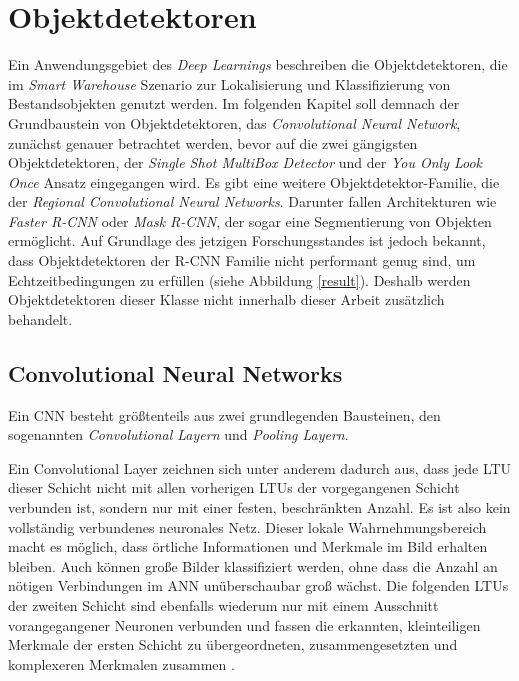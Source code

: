 \section{Objektdetektoren}

Ein Anwendungsgebiet des \textit{Deep Learnings} beschreiben die Objektdetektoren, die im \textit{Smart Warehouse} Szenario zur Lokalisierung und Klassifizierung von Bestandsobjekten genutzt werden. Im folgenden Kapitel soll demnach der Grundbaustein von Objektdetektoren, das \textit{Convolutional Neural Network}, zunächst genauer betrachtet werden, bevor auf die zwei gängigsten Objektdetektoren, der \textit{Single Shot MultiBox Detector} und der \textit{You Only Look Once} Ansatz eingegangen wird. Es gibt eine weitere Objektdetektor-Familie, die der \textit{Regional Convolutional Neural Networks}. Darunter fallen Architekturen wie \textit{Faster R-CNN} oder \textit{Mask R-CNN}, der sogar eine Segmentierung von Objekten ermöglicht. Auf Grundlage des jetzigen Forschungsstandes ist jedoch bekannt, dass Objektdetektoren der R-CNN Familie nicht performant genug sind, um Echtzeitbedingungen zu erfüllen (siehe Abbildung \ref{result}). Deshalb werden Objektdetektoren dieser Klasse nicht innerhalb dieser Arbeit zusätzlich behandelt.

\subsection*{Convolutional Neural Networks}

Ein CNN besteht größtenteils aus zwei grundlegenden Bausteinen, den sogenannten \textit{Convolutional Layern} und \textit{Pooling Layern}.

Ein Convolutional Layer zeichnen sich unter anderem dadurch aus, dass jede LTU dieser Schicht nicht mit allen vorherigen LTUs der vorgegangenen Schicht verbunden ist, sondern nur mit einer festen, beschränkten Anzahl. Es ist also kein vollständig verbundenes neuronales Netz. Dieser \glqq lokale Wahrnehmungsbereich\grqq{} macht es möglich, dass örtliche Informationen und Merkmale im Bild erhalten bleiben. Auch können große Bilder klassifiziert werden, ohne dass die Anzahl an nötigen Verbindungen im ANN unüberschaubar groß wächst. Die folgenden LTUs der zweiten Schicht sind ebenfalls wiederum nur mit einem Ausschnitt vorangegangener Neuronen verbunden und fassen die erkannten, kleinteiligen Merkmale der ersten Schicht zu übergeordneten, zusammengesetzten und komplexeren Merkmalen zusammen \cite{AurelienGeron.2018}.

